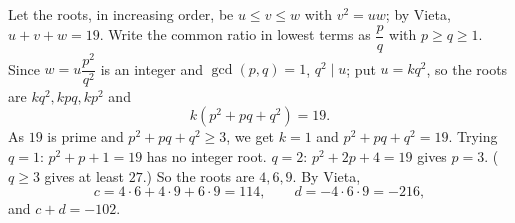 Let the roots, in increasing order, be $u\le v\le w$ with $v^2=uw$; by Vieta, $u+v+w=19$. Write the common ratio in lowest terms as $\dfrac {p}{q}$ with $p\ge q\ge1$. Since $w=u\dfrac{p^2}{q^2}$ is an integer and $\gcd(p,q)=1$, $q^2\mid u$; put $u=kq^2$, so the roots are $kq^2,kpq,kp^2$ and
\[
k\left(p^2+pq+q^2\right)=19 .
\]
As $19$ is prime and $p^2+pq+q^2\ge3$, we get $k=1$ and $p^2+pq+q^2=19$. Trying $q=1$: $p^2+p+1=19$ has no integer root. $q=2$: $p^2+2p+4=19$ gives $p=3$. ($q\ge3$ gives at least $27$.) So the roots are $4,6,9$. By Vieta,
\[
c=4\cdot6+4\cdot9+6\cdot9=114,\qquad d=-4\cdot6\cdot9=-216,
\]
and $c+d=\boxed{-102}$.

